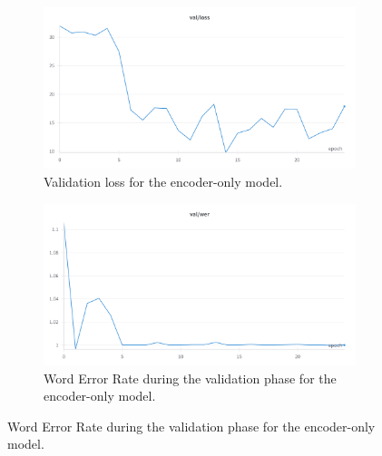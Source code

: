\documentclass{IEEEtran}
\begin{document}
\begin{figure}[h]
    \centering
    \begin{subfigure}[t]{0.45\textwidth}
        \centering
        \includegraphics[width=\textwidth]{figures/loss_ctc.png}
        \caption{Validation loss for the encoder-only model.}
        \label{fig:ctc_loss}
    \end{subfigure}
    \hfill
    \begin{subfigure}[t]{0.45\textwidth}
        \centering
        \includegraphics[width=\textwidth]{figures/wer_ctc.png}
        \caption{Word Error Rate during the validation phase for the encoder-only model.}
        \label{fig:ctc_wer}
    \end{subfigure}

    \vspace{1em}


\end{figure}
\end{document}
